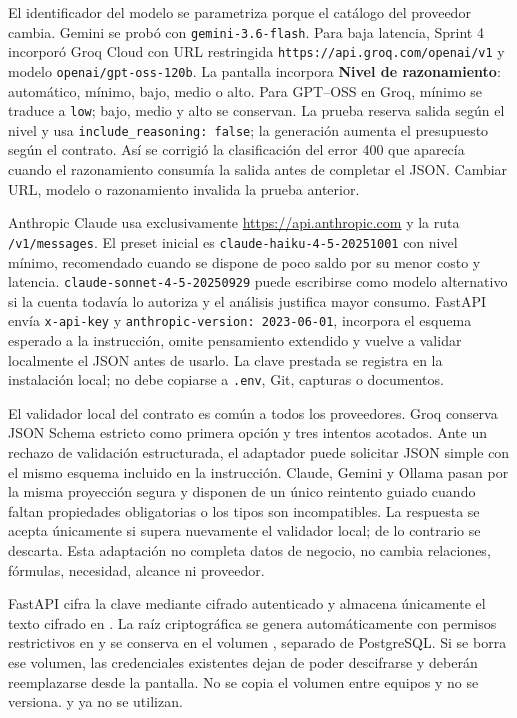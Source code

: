 \documentclass[11pt,letterpaper]{article}
\newcommand{\file}[1]{\texttt{#1}}
\begin{document}
El identificador del modelo se parametriza porque el catálogo del proveedor cambia. Gemini se probó con \file{gemini-3.6-flash}. Para baja latencia, Sprint 4 incorporó Groq Cloud con URL restringida \file{https://api.groq.com/openai/v1} y modelo \file{openai/gpt-oss-120b}. La pantalla incorpora \textbf{Nivel de razonamiento}: automático, mínimo, bajo, medio o alto. Para GPT--OSS en Groq, mínimo se traduce a \file{low}; bajo, medio y alto se conservan. La prueba reserva salida según el nivel y usa \file{include\_reasoning: false}; la generación aumenta el presupuesto según el contrato. Así se corrigió la clasificación del error 400 que aparecía cuando el razonamiento consumía la salida antes de completar el JSON. Cambiar URL, modelo o razonamiento invalida la prueba anterior.

Anthropic Claude usa exclusivamente \url{https://api.anthropic.com} y la ruta \file{/v1/messages}. El preset inicial es \file{claude-haiku-4-5-20251001} con nivel mínimo, recomendado cuando se dispone de poco saldo por su menor costo y latencia. \file{claude-sonnet-4-5-20250929} puede escribirse como modelo alternativo si la cuenta todavía lo autoriza y el análisis justifica mayor consumo. FastAPI envía \file{x-api-key} y \file{anthropic-version: 2023-06-01}, incorpora el esquema esperado a la instrucción, omite pensamiento extendido y vuelve a validar localmente el JSON antes de usarlo. La clave prestada se registra en la instalación local; no debe copiarse a \file{.env}, Git, capturas o documentos.

El validador local del contrato es común a todos los proveedores. Groq conserva JSON Schema estricto como primera opción y tres intentos acotados. Ante un rechazo de validación estructurada, el adaptador puede solicitar JSON simple con el mismo esquema incluido en la instrucción. Claude, Gemini y Ollama pasan por la misma proyección segura y disponen de un único reintento guiado cuando faltan propiedades obligatorias o los tipos son incompatibles. La respuesta se acepta únicamente si supera nuevamente el validador local; de lo contrario se descarta. Esta adaptación no completa datos de negocio, no cambia relaciones, fórmulas, necesidad, alcance ni proveedor.

FastAPI cifra la clave mediante cifrado autenticado y almacena únicamente el texto cifrado en . La raíz criptográfica se genera automáticamente con permisos restrictivos en  y se conserva en el volumen , separado de PostgreSQL. Si se borra ese volumen, las credenciales existentes dejan de poder descifrarse y deberán reemplazarse desde la pantalla. No se copia el volumen entre equipos y no se versiona.  y  ya no se utilizan.
\end{document}
